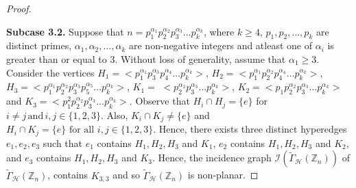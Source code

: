 \documentclass[11pt,a4paper]{article}
\theoremstyle{definition}
\theoremstyle{remark}
\begin{document}
\begin{proof}
\begin{figure}[h]

		\caption{}
		\label{K33}
		
		
		\end{figure}
		
\noindent \textbf{Subcase 3.2.} Suppose that  $n=p_1^{\alpha_1}p_2^{\alpha_2}p_3^{\alpha_3}\ldots p_k^{\alpha_k}$, where  $k\geq 4$, $p_1,p_2, \ldots, p_k$ are distinct primes,  $\alpha_1, \alpha_2, \ldots, \alpha_k$ are non-negative integers and atleast one of $\alpha_i$ is greater than or equal to 3. Without loss of generality, assume that $\alpha_1\geq 3$.  Consider the vertices  $H_1=$$<p_1^{\alpha_1}p_3^{\alpha_3}p_4^{\alpha_4}\ldots p_k^{\alpha_k}>$, $H_2=<p_1^{\alpha_1}p_2^{\alpha_2}p_4^{\alpha_4}\ldots p_k^{\alpha_k}>$, $H_3=<p_1^{\alpha_1}p_2^{\alpha_2}p_3^{\alpha_3}p_5^{\alpha_5} \ldots p_k^{\alpha_k}>$, $K_1=$ $<p_2^{\alpha_2}p_3^{\alpha_3}\ldots p_k^{\alpha_k}>$,
	$K_2=<p_1p_2^{\alpha_2}p_3^{\alpha_3}\ldots p_k^{\alpha_k}>$ and 
	$K_3=<p_1^2p_2^{\alpha_2}p_3^{\alpha_3}\ldots p_k^{\alpha_k}>$. Observe that   $H_i \cap H_j=\{e\}$ for  $i\neq j \, \text{and} \, i,j \in \{1,2,3\}.$ Also, $  K_i \cap K_j \neq \{e\}$ and $ H_i \cap K_j = \{e\} \, \, \text{for all} \, \, i,j \in \{1,2,3\}.$ Hence, there exists three distinct hyperedges $e_1,e_2,e_3$ such that $e_1$ contains $H_1,H_2,H_3$ and $K_1$, $e_2$ contains $H_1,H_2,H_3$ and $K_2$, and $e_3$ contains $H_1,H_2,H_3$ and $K_3$.  Hence, the incidence graph $\mathcal{I}(\tilde{\Gamma}_\mathcal{H}(\mathbb{Z}_n))$ of  $\tilde{\Gamma}_\mathcal{H}(\mathbb{Z}_n)$, contains $K_{3,3}$ and so $\tilde{\Gamma}_\mathcal{H}(\mathbb{Z}_n)$ is non-planar.
	\end{proof}
\end{document}
